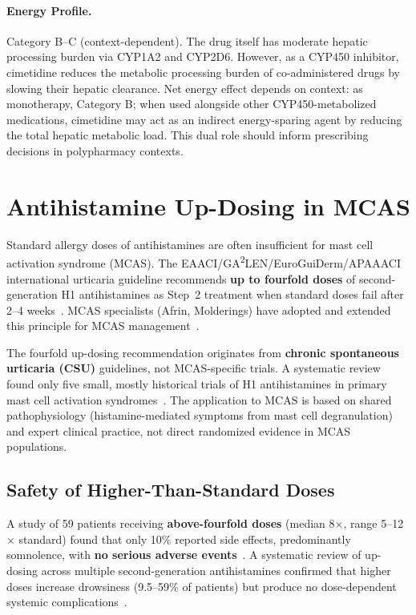 \paragraph{Energy Profile.}
Category B--C (context-dependent). The drug itself has moderate hepatic processing burden via CYP1A2 and CYP2D6. However, as a CYP450 inhibitor, cimetidine reduces the metabolic processing burden of co-administered drugs by slowing their hepatic clearance. Net energy effect depends on context: as monotherapy, Category B; when used alongside other CYP450-metabolized medications, cimetidine may act as an indirect energy-sparing agent by reducing the total hepatic metabolic load. This dual role should inform prescribing decisions in polypharmacy contexts.

\section{Antihistamine Up-Dosing in MCAS}
\label{sec:antihistamine-updosing}

Standard allergy doses of antihistamines are often insufficient for mast cell activation syndrome (MCAS). The EAACI/GA\textsuperscript{2}LEN/EuroGuiDerm/APAAACI international urticaria guideline recommends \textbf{up to fourfold doses} of second-generation H1 antihistamines as Step~2 treatment when standard doses fail after 2--4 weeks~\cite{Zuberbier2022urticaria}. MCAS specialists (Afrin, Molderings) have adopted and extended this principle for MCAS management~\cite{Afrin2013MCAS,Molderings2016pharmacological}.

\begin{warning}
The fourfold up-dosing recommendation originates from \textbf{chronic spontaneous urticaria (CSU)} guidelines, not MCAS-specific trials. A systematic review found only five small, mostly historical trials of H1 antihistamines in primary mast cell activation syndromes~\cite{Nurmatov2015H1systematic}. The application to MCAS is based on shared pathophysiology (histamine-mediated symptoms from mast cell degranulation) and expert clinical practice, not direct randomized evidence in MCAS populations.
\end{warning}

\subsection{Safety of Higher-Than-Standard Doses}

A study of 59 patients receiving \textbf{above-fourfold doses} (median 8$\times$, range 5--12$\times$ standard) found that only 10\% reported side effects, predominantly somnolence, with \textbf{no serious adverse events}~\cite{VandenElzen2017updosing}. A systematic review of up-dosing across multiple second-generation antihistamines confirmed that higher doses increase drowsiness (9.5--59\% of patients) but produce no dose-dependent systemic complications~\cite{Podder2023updosing}.

